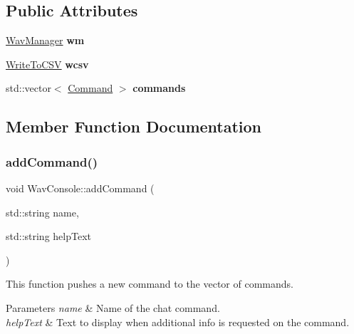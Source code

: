 \subsection*{Public Attributes}
\begin{DoxyCompactItemize}
\item 
\mbox{\label{classWavConsole_adcec7b4b592a3b2fa08c566c7a409ac6}} 
\hyperlink{classWavManager}{Wav\+Manager} {\bfseries wm}
\item 
\mbox{\label{classWavConsole_ac86ec2cd3fa6a3f9ba04dd3fa9e0b804}} 
\hyperlink{classWriteToCSV}{Write\+To\+C\+SV} {\bfseries wcsv}
\item 
\mbox{\label{classWavConsole_a55c09e96cfa25fb73c6dfd963e5f61ef}} 
std\+::vector$<$ \hyperlink{classCommand}{Command} $>$ {\bfseries commands}
\end{DoxyCompactItemize}


\subsection{Member Function Documentation}
\mbox{\label{classWavConsole_af15680c1257375a6f687ad5c4c0b9b0c}} 
\subsubsection{\texorpdfstring{add\+Command()}{addCommand()}}
{\footnotesize\ttfamily void Wav\+Console\+::add\+Command (\begin{DoxyParamCaption}\item[{std\+::string}]{name,  }\item[{std\+::string}]{help\+Text }\end{DoxyParamCaption})}



This function pushes a new command to the vector of commands. 


\begin{DoxyParams}{Parameters}
{\em name} & Name of the chat command. \\
\hline
{\em help\+Text} & Text to display when additional info is requested on the command. \\
\hline
\end{DoxyParams}
\mbox{\label{classWavConsole_ae5ee40c484223159f58d2758c0dba340}} 
